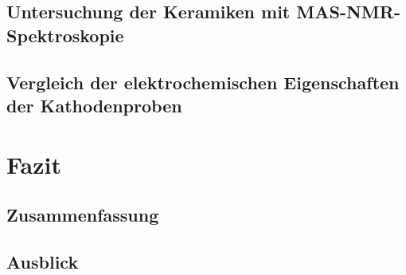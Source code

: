 \documentclass[a4paper, 11pt, headsepline,footsepline,twoside,abstract]{scrbook}
\begin{document}
\section{Untersuchung der Keramiken mit MAS-NMR-Spektroskopie}

\section{Vergleich der elektrochemischen Eigenschaften der Kathodenproben}
\chapter{Fazit}
\section{Zusammenfassung}
\section{Ausblick}
\renewcommand{\thesection}{\Alph{section}}

\cleardoublepage
{}
\listoffigures

\cleardoublepage
{}

 

\end{document}
